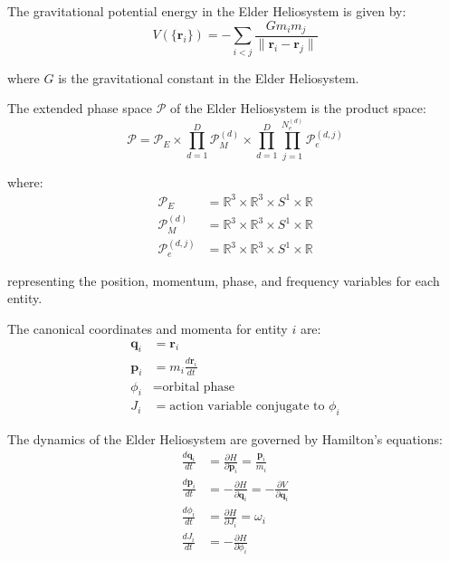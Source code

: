 \begin{definition}
The gravitational potential energy in the Elder Heliosystem is given by:
\begin{equation}
V(\{\mathbf{r}_i\}) = -\sum_{i < j} \frac{G m_i m_j}{\|\mathbf{r}_i - \mathbf{r}_j\|}
\end{equation}

where $G$ is the gravitational constant in the Elder Heliosystem.
\end{definition}

\begin{definition}
The extended phase space $\mathcal{P}$ of the Elder Heliosystem is the product space:
\begin{equation}
\mathcal{P} = \mathcal{P}_E \times \prod_{d=1}^D \mathcal{P}_M^{(d)} \times \prod_{d=1}^D \prod_{j=1}^{N_e^{(d)}} \mathcal{P}_e^{(d,j)}
\end{equation}

where:
\begin{align}
\mathcal{P}_E &= \mathbb{R}^3 \times \mathbb{R}^3 \times S^1 \times \mathbb{R} \\
\mathcal{P}_M^{(d)} &= \mathbb{R}^3 \times \mathbb{R}^3 \times S^1 \times \mathbb{R} \\
\mathcal{P}_e^{(d,j)} &= \mathbb{R}^3 \times \mathbb{R}^3 \times S^1 \times \mathbb{R}
\end{align}

representing the position, momentum, phase, and frequency variables for each entity.
\end{definition}

\begin{definition}
The canonical coordinates and momenta for entity $i$ are:
\begin{align}
\mathbf{q}_i &= \mathbf{r}_i \\
\mathbf{p}_i &= m_i \frac{d\mathbf{r}_i}{dt} \\
\phi_i &= \text{orbital phase} \\
J_i &= \text{action variable conjugate to } \phi_i
\end{align}
\end{definition}

\begin{theorem}
The dynamics of the Elder Heliosystem are governed by Hamilton's equations:
\begin{align}
\frac{d\mathbf{q}_i}{dt} &= \frac{\partial H}{\partial \mathbf{p}_i} = \frac{\mathbf{p}_i}{m_i} \\
\frac{d\mathbf{p}_i}{dt} &= -\frac{\partial H}{\partial \mathbf{q}_i} = -\frac{\partial V}{\partial \mathbf{q}_i} \\
\frac{d\phi_i}{dt} &= \frac{\partial H}{\partial J_i} = \omega_i \\
\frac{dJ_i}{dt} &= -\frac{\partial H}{\partial \phi_i}
\end{align}
\end{theorem}

